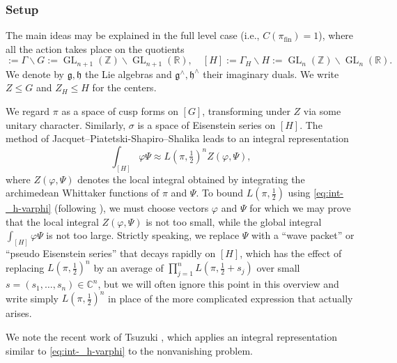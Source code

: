 \documentclass[reqno]{amsart}
\DeclareMathOperator{\GL}{GL}
\DeclareMathOperator{\fin}{fin}
\theoremstyle{plain} \newtheorem{theorem} {Theorem}
\theoremstyle{definition} \newtheorem{definition} [theorem] {Definition}
\theoremstyle{itplain} %
\numberwithin{equation}{section}
\numberwithin{theorem}{section}
\renewcommand{\leq}{\leqslant}
\begin{document}
\subsubsection{Setup}
The main ideas may be explained in the full level case (i.e., $C(\pi_{\fin}) = 1$), where all the action takes place on the quotients
\begin{equation*}
  [G] := \Gamma \backslash G := \GL_{n+1}(\mathbb{Z}) \backslash \GL_{n+1}(\mathbb{R}),
  \quad
  [H] := \Gamma_H \backslash H := \GL_{n}(\mathbb{Z}) \backslash \GL_{n}(\mathbb{R}).
\end{equation*}
We denote by $\mathfrak{g}, \mathfrak{h}$ the Lie algebras and  $\mathfrak{g}^\wedge, \mathfrak{h}^\wedge$ their imaginary duals.  We write $Z \leq G$ and $Z_H \leq H$ for the centers.

We regard $\pi$ as a space of cusp forms on $[G]$, transforming under $Z$ via some unitary character.  Similarly, $\sigma$ is a space of Eisenstein series on $[H]$.  The method of Jacquet--Piatetski-Shapiro--Shalika leads to an integral representation
\begin{equation}\label{eq:int-_h-varphi}
  \int _{[H]} \varphi \Psi \approx L(\pi,\tfrac{1}{2})^{n} Z(\varphi,\Psi),
\end{equation}
where $Z(\varphi,\Psi)$ denotes the local integral obtained by integrating the archimedean Whittaker functions
of $\pi$ and $\Psi$.  To bound $L(\pi,\tfrac{1}{2})$ using \eqref{eq:int-_h-varphi} (following \cite{MR2726097, venkatesh-2005, michel-2009}), we must choose vectors $\varphi$ and $\Psi$ for which we may prove that the local integral $Z(\varphi, \Psi)$ is not too small, while the global integral $\int_{[H]} \varphi \Psi$ is not too large.  Strictly speaking, we replace $\Psi$ with a ``wave packet'' or ``pseudo Eisenstein series'' that decays rapidly on $[H]$, which has the effect of replacing $L(\pi,\tfrac{1}{2})^n$ by an average of $\prod_{j=1}^n L(\pi,\tfrac{1}{2} + s_j)$ over small $s = (s_1,\dotsc,s_n) \in \mathbb{C}^n$, but we will often ignore this point in this overview and write simply $L(\pi,\tfrac{1}{2})^n$ in place of the more complicated expression that actually arises.

We note the recent work of Tsuzuki \cite{2021arXiv210307835T}, which applies an integral representation similar to \eqref{eq:int-_h-varphi} to the nonvanishing problem.
\end{document}
